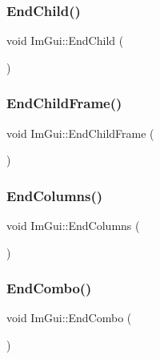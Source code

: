 \hypertarget{namespace_im_gui_af8de559a88c1442d6df8c1b04c86e997}{}\label{namespace_im_gui_af8de559a88c1442d6df8c1b04c86e997} 
\subsubsection{\texorpdfstring{End\+Child()}{EndChild()}}
{\footnotesize\ttfamily void Im\+Gui\+::\+End\+Child (\begin{DoxyParamCaption}{ }\end{DoxyParamCaption})}

\hypertarget{namespace_im_gui_ac4bd9024554b5074805bc0ce3076c514}{}\label{namespace_im_gui_ac4bd9024554b5074805bc0ce3076c514} 
\subsubsection{\texorpdfstring{End\+Child\+Frame()}{EndChildFrame()}}
{\footnotesize\ttfamily void Im\+Gui\+::\+End\+Child\+Frame (\begin{DoxyParamCaption}{ }\end{DoxyParamCaption})}

\hypertarget{namespace_im_gui_af93bed3bce5475fe4d525d744f16aa20}{}\label{namespace_im_gui_af93bed3bce5475fe4d525d744f16aa20} 
\subsubsection{\texorpdfstring{End\+Columns()}{EndColumns()}}
{\footnotesize\ttfamily void Im\+Gui\+::\+End\+Columns (\begin{DoxyParamCaption}{ }\end{DoxyParamCaption})}

\hypertarget{namespace_im_gui_a63434692d7de278875c7ea0143fbe6e4}{}\label{namespace_im_gui_a63434692d7de278875c7ea0143fbe6e4} 
\subsubsection{\texorpdfstring{End\+Combo()}{EndCombo()}}
{\footnotesize\ttfamily void Im\+Gui\+::\+End\+Combo (\begin{DoxyParamCaption}{ }\end{DoxyParamCaption})}

